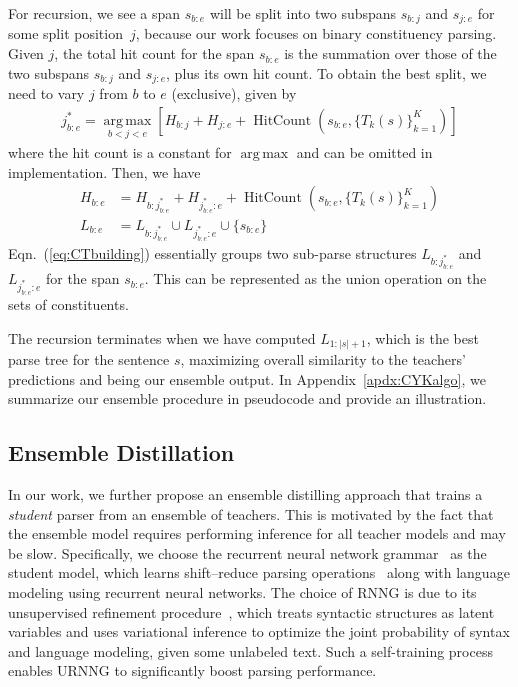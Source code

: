 \documentclass{article}
\DeclareMathOperator*{\argmax}{arg\,max}
\begin{document}
For recursion, we see a span $s_{b:e}$ will be split into two subspans $s_{b:j}$ and $s_{j:e}$ for some split position~$j$, because our work focuses on binary constituency parsing. Given $j$, the total hit count for the span $s_{b:e}$ is the summation over those of the two subspans $s_{b:j}$ and $s_{j:e}$, plus its own hit count. To obtain the best split, we need to vary $j$ from $b$ to $e$ (exclusive), given by
\begin{align}
\label{eq:splitpointJ}
j_{b:e}^* = \argmax\limits_{b < j < e} 
\left[H_{b:j}+H_{j:e}+\operatorname{HitCount}(s_{b:e}, \{T_k(s)\}_{k=1}^K)\right]
\end{align}
where the hit count is a constant for $\argmax$ and can be omitted in implementation. Then, we have
\begin{align}
H_{b:e} &= H_{b:j_{b:e}^*} + H_{j_{b:e}^*:e} + \operatorname{HitCount}(s_{b:e}, \{T_k(s)\}_{k=1}^K)\\
\label{eq:CTbuilding}
L_{b:e} &= L_{b:j_{b:e}^*} \cup L_{j_{b:e}^*:e} \cup \{s_{b:e}\}
\end{align}
Eqn.~(\ref{eq:CTbuilding}) essentially groups two sub-parse structures $L_{b:j_{b:e}^*}$ and $L_{j_{b:e}^*:e}$ for the span $s_{b:e}$. This can be represented as the union operation on the sets of constituents.

The recursion terminates when we have computed $L_{1:|s|+1}$, which is the best parse tree for the sentence $s$, maximizing overall similarity to the teachers' predictions and being our ensemble output.
In Appendix~\ref{apdx:CYKalgo}, we summarize our ensemble procedure in pseudocode and provide an illustration. 

\subsection{Ensemble Distillation}
\label{sec:ensembledistillation}

In our work, we further propose an ensemble distilling approach that trains a \textit{student} parser from an ensemble of teachers. This is motivated by the fact that the ensemble model requires performing inference for all teacher models and may be slow.
Specifically, we choose the recurrent neural network grammar~\citep[RNNG;][]{dyer-etal-2016-recurrent} as the student model, which learns shift--reduce parsing operations~\citep{shiftreduce} along with language modeling using recurrent neural networks.  The choice of RNNG is due to its unsupervised refinement procedure~\citep[URNNG;][]{kim-etal-2019-unsupervised}, which treats syntactic structures as latent variables and uses variational inference to optimize the joint probability of syntax and language modeling, given some unlabeled text. Such a self-training process enables URNNG to significantly boost parsing performance. 
\end{document}
